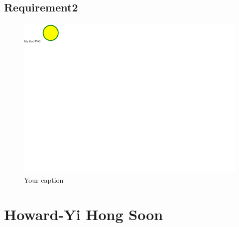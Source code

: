 \documentclass{article}
\begin{document}
	\subsection{Requirement2}
		\begin{figure}[h!]
		    \centering
		    \captionsetup{labelformat=empty}
		    \caption{Your caption}
		    \includegraphics[width=\textwidth, angle=0]{Kreis2.pdf}
		\end{figure}
		\newpage

\section{Howard-Yi Hong Soon}
\end{document}
